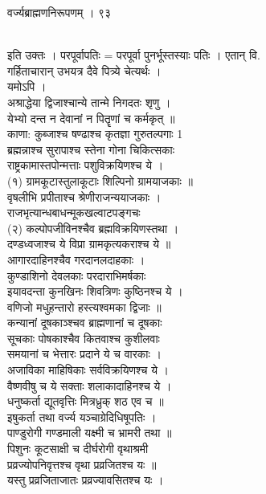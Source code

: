 \documentclass[11pt, openany]{book}
\begin{document}
{{ }{ वर्ज्यब्राह्मणनिरूपणम् । ९३}{\\
इति उक्तः । परपूर्वापतिः = परपूर्वा पुनर्भूस्तस्याः पतिः । एतान् वि.\\
गर्हिताचारान् उभयत्र दैवे पित्र्ये चेत्यर्थः ।\\
यमोऽपि ।\\
अश्राद्धेया द्विजाश्चान्ये तान्मे निगदतः शृणु ।\\
येभ्यो दन्त न देवानां न पितॄणां च कर्मकृत् ॥\\
काणा: कुब्जाश्च षण्ढाश्च कृतज्ञा गुरुतल्पगाः 1\\
ब्रह्मन्नाश्च सुरापाश्च स्तेना गोना चिकित्सकाः \textbar{}\textbar{}\\
राष्ट्रकामास्तपोन्मत्ताः पशुविक्रयिणश्च ये ।\\
(१) ग्रामकूटास्तुलाकूटाः शिल्पिनो ग्रामयाजकाः ॥\\
वृषलीभि प्रपीताश्च श्रेणीराजन्ययाजकाः ।\\
राजभृत्यान्धबाधन्मूकखल्वाटपङ्गचः \textbar{}\textbar{}\\
(२) कल्पोपजीविनश्चैव ब्रह्मविक्रयिणस्तथा ।\\
दण्डध्वजाश्च ये विप्रा ग्रामकृत्यकराश्च ये ॥\\
आगारदाहिनश्चैव गरदानलदाहकाः ।\\
कुण्डाशिनो देवलकाः परदाराभिमर्षकाः\\
इयावदन्ता कुनखिनः शिवत्रिणः कुष्ठिनश्च ये ।\\
वणिजो मधुहन्तारो हस्त्यश्वमका द्विजाः ॥\\
कन्यानां दूषकाञ्श्चव ब्राह्मणानां च दूषकाः \textbar{}\\
सूचकाः पोषकाश्चैव कितवाश्च कुशीलवाः \textbar{}\textbar{}\\
समयानां च भेत्तारः प्रदाने ये च वारकाः ।\\
अजाविका माहिषिकाः सर्वविक्रयिणश्च ये ।\\
वैष्णवीषु च ये सक्ताः शलाकादाहिनश्च ये ।\\
धनुष्कर्ता द्यूतवृत्तिः मित्रध्रुक् शठ एव च ॥\\
इषुकर्ता तथा वर्ज्य यञ्चाग्रेदिधिषूपतिः ।\\
पाण्डुरोगी गण्डमाली यक्ष्मी च भ्रामरी तथा ॥\\
पिशुनः कूटसाक्षी च दीर्घरोगी वृथाश्रमी \textbar{}\\
प्रव्रज्योपनिवृत्तश्च वृथा प्रव्रजितश्च यः ॥\\
यस्तु प्रव्रजिताजातः प्रव्रज्यावसितश्च यः ।


}}
\end{document}
